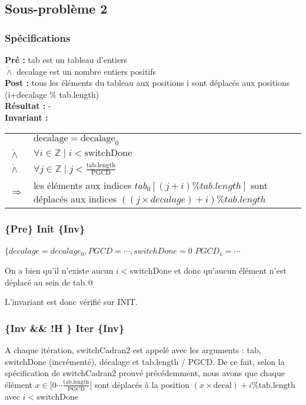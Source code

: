 \subsection{Sous-problème 2}
\subsubsection*{Spécifications}

\noindent \textbf{Pré :} tab est un tableau d'entiers\\
\indent $\dot{\wedge}$ decalage est un nombre entiers positifs\\
\textbf{Post :} tous les éléments du tableau aux positions i sont déplacés aux positions (i+decalage \% tab.length)\\
\textbf{Résultat :} - \\



\textbf{Invariant :}

\begin{tabular}{lp{14cm}}

& $\mathrm{decalage}=\mathrm{decalage}_{0}$ \\
$\dot{\wedge}$ & $\forall i \in \mathbb{Z} \mid i < \mathrm{switchDone} $ \\
$\dot{\wedge}$ & $\forall j \in \mathbb{Z} \mid j < \frac{\mathrm{tab.length}}{\mathrm{PGCD}}$ \\
$\Rightarrow$ & les éléments aux indices $tab_{0}[(j+i) \% tab.length]$ sont déplacés aux indices $((j\times decalage)+i) \% tab.length$ \\
\end{tabular}

\subsubsection*{\{Pre\} Init \{Inv\}}

$\{decalage=decalage_{0}, PGCD =\cdots, switchDone=0$
$PGCD_{1} = \cdots$

On a bien qu'il n'existe aucun $i < \mathrm{switchDone}$ et donc
qu'aucun élément n'est déplacé au sein de tab.@

L'invariant est donc vérifié sur INIT.

\subsubsection*{\{Inv \&\& !H \} Iter \{Inv\}}

A chaque itération, switchCadran2 est appelé avec les arguments : tab,
switchDone (incrémenté), décalage et tab.length / PGCD. De ce fait,
selon la spécification de switchCadran2 prouvé précédemment, nous avons
que chaque élément $x \in [0\cdots
    \frac{\mathrm{tab.length}}{\mathrm{PGCD}}[$ sont déplacés à la
        position $(x\times \mathrm{decal})+i \% \mathrm{tab.length}$ avec $i < \mathrm{switchDone}$


